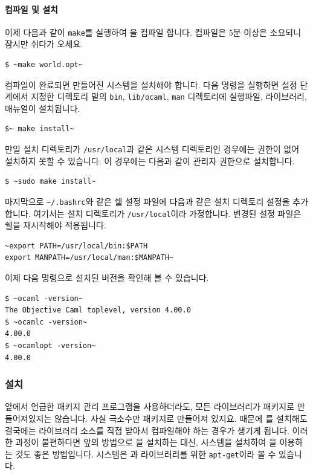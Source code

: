 \paragraph{컴파일 및 설치} 이제 다음과 같이 \texttt{make}를 실행하여
\OCAML{}을 컴파일 합니다. 컴파일은 5분 이상은 소요되니 잠시만 쉬다가 오세요.

\begin{lstlisting}
$ ~make world.opt~
\end{lstlisting}

컴파일이 완료되면 만들어진 \OCAML{} 시스템을 설치해야 합니다. 다음 명령을
실행하면 설정 단계에서 지정한 디렉토리 밑의 \texttt{bin}, \texttt{lib/ocaml},
\texttt{man} 디렉토리에 실행파일, 라이브러리, 매뉴얼이 설치됩니다.

\begin{lstlisting}
$~ make install~
\end{lstlisting}

만일 설치 디렉토리가 \texttt{/usr/local}과 같은 시스템 디렉토리인
경우에는 권한이 없어 설치하지 못할 수 있습니다. 이 경우에는 다음과 같이 관리자
권한으로 설치합니다.

\begin{lstlisting}
$ ~sudo make install~
\end{lstlisting}

마지막으로 \texttt{\~{}/.bashrc}와 같은 쉘 설정 파일에 다음과 같은 설치 디렉토리
설정을 추가합니다. 여기서는 설치 디렉토리가 \texttt{/usr/local}이라
가정합니다. 변경된 설정 파일은 쉘을 재시작해야 적용됩니다.

\begin{lstlisting}
~export PATH=/usr/local/bin:$PATH
export MANPATH=/usr/local/man:$MANPATH~
\end{lstlisting}

이제 다음 명령으로 설치된 \OCAML{} 버전을 확인해 볼 수 있습니다.

\begin{lstlisting}
$ ~ocaml -version~
The Objective Caml toplevel, version 4.00.0
$ ~ocamlc -version~
4.00.0
$ ~ocamlopt -version~
4.00.0
\end{lstlisting}


\subsubsection{\GODI{} 설치}

앞에서 언급한 \BREW{} 패키지 관리 프로그램을 사용하더라도, 모든 \OCAML{}
라이브러리가 \BREW{} 패키지로 만들어져있지는 않습니다. 사실 극소수만 패키지로
만들어져 있지요. 때문에 \BREW{}를 설치해도 결국에는 라이브러리 소스를 직접
받아서 컴파일해야 하는 경우가 생기게 됩니다. 이러한 과정이 불편하다면 앞의
방법으로 \OCAML{}을 설치하는 대신, \GODI{} 시스템을 설치하여 \OCAML{}을
이용하는 것도 좋은 방법입니다. \GODI{} 시스템은 \OCAML{}과 \OCAML{}
라이브러리를 위한 \texttt{apt-get}이라 볼 수 있습니다.

